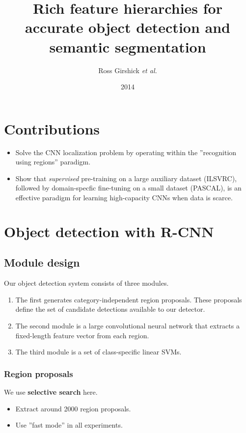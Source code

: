 \documentclass[a4paper,12pt]{article}
\title{Rich feature hierarchies for accurate object detection and semantic segmentation}
\author{Ross Girshick \emph{et al.}}
\date{2014}
\begin{document}
  \maketitle

\section{Contributions}

\begin{itemize}
  \item Solve the CNN localization problem by operating within the ''recognition using regions'' paradigm.
  \item Show that \emph{supervised} pre-training on a large auxiliary dataset (ILSVRC), followed by domain-specfic fine-tuning on a small dataset (PASCAL), is an effective paradigm for learning high-capacity CNNs when data is scarce.
\end{itemize}

\section{Object detection with R-CNN}

\subsection{Module design}

Our object detection system consists of three modules.

\begin{enumerate}
  \item The first generates category-independent region proposals. These proposals define the set of candidate detections available to our detector.
  \item The second module is a large convolutional neural network that extracts a fixed-length feature vector from each region.
  \item The third module is a set of class-specific linear SVMs.
\end{enumerate}

\subsubsection{Region proposals}

We use \textbf{selective search} here.

\begin{itemize}
  \item Extract around 2000 region proposals.
  \item Use ''fast mode'' in all experiments.
\end{itemize}
\end{document}
